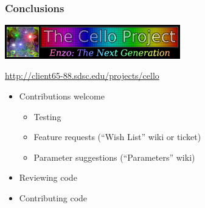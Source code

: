 \begin{frame}[fragile] \frametitle{Conclusions}
\centerline{\includegraphics[width=3in]{cello-logo.png}}
\centerline{\textcolor{blue}{\url{http://client65-88.sdsc.edu/projects/cello}}}
\begin{itemize}
\item Contributions welcome
\begin{itemize}
\item Testing
\item Feature requests (``Wish List'' wiki or ticket)
\item Parameter suggestions (``Parameters'' wiki)
\end{itemize}
\item Reviewing code
\item Contributing code
\end{itemize}
\end{frame}
